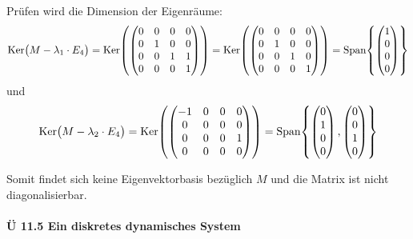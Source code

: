 \documentclass{scrreprt}
\begin{document}
\begin{enumerate}[(a)]
\begin{itemize}
    Prüfen wird die Dimension der Eigenräume:
    \[
      \text{Ker}\qty\big(M - \lambda_1 \cdot E_4)
      = \text{Ker}\qty(\begin{pmatrix}
        0 & 0 & 0 & 0 \\
        0 & 1 & 0 & 0 \\
        0 & 0 & 1 & 1 \\
        0 & 0 & 0 & 1 \\
      \end{pmatrix})
      = \text{Ker}\qty(\begin{pmatrix}
        0 & 0 & 0 & 0 \\
        0 & 1 & 0 & 0 \\
        0 & 0 & 1 & 0 \\
        0 & 0 & 0 & 1 \\
      \end{pmatrix})
      = \text{Span}\qty{\begin{pmatrix} 1 \\ 0 \\ 0 \\ 0 \end{pmatrix}}
    \]
    und
    \[
      \text{Ker}\qty\big(M - \lambda_2 \cdot E_4)
      = \text{Ker}\qty(\begin{pmatrix}
        -1 & 0 & 0 & 0 \\
        0  & 0 & 0 & 0 \\
        0  & 0 & 0 & 1 \\
        0  & 0 & 0 & 0 \\
      \end{pmatrix})
      = \text{Span}\qty{
        \begin{pmatrix} 0 \\ 1 \\ 0 \\ 0 \end{pmatrix},
        \begin{pmatrix} 0 \\ 0 \\ 1 \\ 0 \end{pmatrix}
      }
    \]

    Somit findet sich keine Eigenvektorbasis bezüglich $M$ und die Matrix ist
    nicht diagonalisierbar.
  \end{itemize}
\end{enumerate}

\newpage
\paragraph{Ü 11.5 Ein diskretes dynamisches System}
\end{document}
